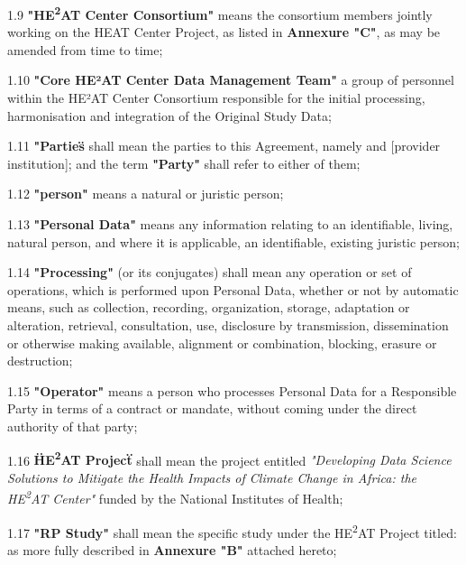 1.9 \textbf{"HE\textsuperscript{2}AT Center Consortium"} means the consortium members jointly working on the HEAT Center Project, as listed in \textbf{Annexure "C"}, as may be amended from time to time;

1.10 \textbf{"Core HE²AT Center Data Management Team"} a group of  personnel within the HE²AT Center Consortium responsible for the initial processing, harmonisation and integration of the Original Study Data;

1.11 \textbf{"Parties\"} shall mean the parties to this Agreement, namely  and [provider institution]; and the term \textbf{"Party"} shall refer to either of them;

1.12 \textbf{"person"} means a natural or juristic person;

1.13 \textbf{"Personal Data"} means any information relating to an identifiable, living, natural person, and where it is applicable, an identifiable, existing juristic person;

1.14 \textbf{"Processing"} (or its conjugates) shall mean any operation or set of operations, which is performed upon Personal Data, whether or not by automatic means, such as collection, recording, organization, storage, adaptation or alteration, retrieval, consultation, use, disclosure by transmission, dissemination or otherwise making available, alignment or combination, blocking, erasure or destruction;

1.15 \textbf{"Operator"} means a person who processes Personal Data for a Responsible Party in terms of a contract or mandate, without coming under the direct authority of that party;

1.16 \textbf{\"HE\textsuperscript{2}AT Project\"} shall mean the project entitled \textit{"Developing Data Science Solutions to Mitigate the Health Impacts of Climate Change in Africa: the HE\textsuperscript{2}AT Center"} funded by the National Institutes of Health;

1.17 \textbf{"RP Study"} shall mean the specific study under the HE\textsuperscript{2}AT Project titled:  as more fully described in \textbf{Annexure "B"} attached hereto;

